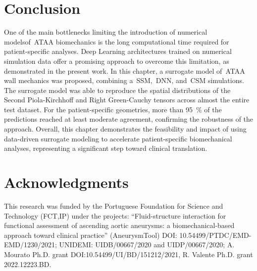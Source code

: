 \documentclass[a4paper,fleqn]{cas-sc}
\begin{document}
\section{Conclusion} \label{sec:conclusion}
One of the main bottlenecks limiting the introduction of numerical modelsof~\gls{ATAA} biomechanics is the long computational time required for patient-specific analyses. Deep Learning architectures trained on numerical simulation data offer a promising approach to overcome this limitation, as demonstrated in the present work. In this chapter, a surrogate model of~\gls{ATAA} wall mechanics was proposed, combining a~\gls{SSM},~\gls{DNN}, and~\gls{CSM} simulations. The surrogate model was able to reproduce the spatial distributions of the Second Piola-Kirchhoff and Right Green-Cauchy tensors across almost the entire test dataset. For the patient-specific geometries, more than 95~\% of the predictions reached at least moderate agreement, confirming the robustness of the approach. Overall, this chapter demonstrates the feasibility and impact of using data-driven surrogate modeling to accelerate patient-specific biomechanical analyses, representing a significant step toward clinical translation.

\section*{Acknowledgments}
This research was funded by the Portuguese Foundation for Science and Technology (FCT,IP) under the projects: “Fluid-structure interaction for functional assessment of ascending aortic aneurysms: a biomechanical-based approach toward clinical practice” (AneurysmTool) DOI: 10.54499/PTDC/EMD-EMD/1230/2021; UNIDEMI: UIDB/00667/2020 and UIDP/00667/2020; A. Mourato Ph.D. grant DOI:10.54499/UI/BD/151212/2021, R. Valente Ph.D. grant 2022.12223.BD.

\printcredits


%


\end{document}
